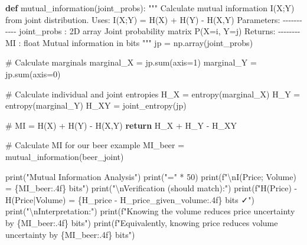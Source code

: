 \documentclass[
  11pt,
  letterpaper,
  oneside,
  openany]{book}
\newenvironment{Shaded}{\begin{snugshade}}{\end{snugshade}}
\newcommand{\BuiltInTok}[1]{\textcolor[rgb]{0.00,0.23,0.31}{#1}}
\newcommand{\CharTok}[1]{\textcolor[rgb]{0.13,0.47,0.30}{#1}}
\newcommand{\CommentTok}[1]{\textcolor[rgb]{0.37,0.37,0.37}{#1}}
\newcommand{\ControlFlowTok}[1]{\textcolor[rgb]{0.00,0.23,0.31}{\textbf{#1}}}
\newcommand{\DecValTok}[1]{\textcolor[rgb]{0.68,0.00,0.00}{#1}}
\newcommand{\KeywordTok}[1]{\textcolor[rgb]{0.00,0.23,0.31}{\textbf{#1}}}
\newcommand{\NormalTok}[1]{\textcolor[rgb]{0.00,0.23,0.31}{#1}}
\newcommand{\OperatorTok}[1]{\textcolor[rgb]{0.37,0.37,0.37}{#1}}
\newcommand{\SpecialCharTok}[1]{\textcolor[rgb]{0.37,0.37,0.37}{#1}}
\newcommand{\SpecialStringTok}[1]{\textcolor[rgb]{0.13,0.47,0.30}{#1}}
\newcommand{\StringTok}[1]{\textcolor[rgb]{0.13,0.47,0.30}{#1}}
\begin{document}
\begin{Shaded}
\begin{Highlighting}[]
\KeywordTok{def}\NormalTok{ mutual\_information(joint\_probs):}
    \CommentTok{"""}
\CommentTok{    Calculate mutual information I(X;Y) from joint distribution.}
\CommentTok{    }
\CommentTok{    Uses: I(X;Y) = H(X) + H(Y) {-} H(X,Y)}
\CommentTok{    }
\CommentTok{    Parameters:}
\CommentTok{    {-}{-}{-}{-}{-}{-}{-}{-}{-}{-}{-}}
\CommentTok{    joint\_probs : 2D array}
\CommentTok{        Joint probability matrix P(X=i, Y=j)}
\CommentTok{        }
\CommentTok{    Returns:}
\CommentTok{    {-}{-}{-}{-}{-}{-}{-}{-}}
\CommentTok{    MI : float}
\CommentTok{        Mutual information in bits}
\CommentTok{    """}
\NormalTok{    jp }\OperatorTok{=}\NormalTok{ np.array(joint\_probs)}
    
    \CommentTok{\# Calculate marginals}
\NormalTok{    marginal\_X }\OperatorTok{=}\NormalTok{ jp.}\BuiltInTok{sum}\NormalTok{(axis}\OperatorTok{=}\DecValTok{1}\NormalTok{)}
\NormalTok{    marginal\_Y }\OperatorTok{=}\NormalTok{ jp.}\BuiltInTok{sum}\NormalTok{(axis}\OperatorTok{=}\DecValTok{0}\NormalTok{)}
    
    \CommentTok{\# Calculate individual and joint entropies}
\NormalTok{    H\_X }\OperatorTok{=}\NormalTok{ entropy(marginal\_X)}
\NormalTok{    H\_Y }\OperatorTok{=}\NormalTok{ entropy(marginal\_Y)}
\NormalTok{    H\_XY }\OperatorTok{=}\NormalTok{ joint\_entropy(jp)}
    
    \CommentTok{\# MI = H(X) + H(Y) {-} H(X,Y)}
    \ControlFlowTok{return}\NormalTok{ H\_X }\OperatorTok{+}\NormalTok{ H\_Y }\OperatorTok{{-}}\NormalTok{ H\_XY}


\CommentTok{\# Calculate MI for our beer example}
\NormalTok{MI\_beer }\OperatorTok{=}\NormalTok{ mutual\_information(beer\_joint)}

\BuiltInTok{print}\NormalTok{(}\StringTok{"Mutual Information Analysis"}\NormalTok{)}
\BuiltInTok{print}\NormalTok{(}\StringTok{"="} \OperatorTok{*} \DecValTok{50}\NormalTok{)}
\BuiltInTok{print}\NormalTok{(}\SpecialStringTok{f"}\CharTok{\textbackslash{}n}\SpecialStringTok{I(Price; Volume) = }\SpecialCharTok{\{}\NormalTok{MI\_beer}\SpecialCharTok{:.4f\}}\SpecialStringTok{ bits"}\NormalTok{)}
\BuiltInTok{print}\NormalTok{(}\StringTok{"}\CharTok{\textbackslash{}n}\StringTok{Verification (should match):"}\NormalTok{)}
\BuiltInTok{print}\NormalTok{(}\SpecialStringTok{f"H(Price) {-} H(Price|Volume) = }\SpecialCharTok{\{}\NormalTok{H\_price }\OperatorTok{{-}}\NormalTok{ H\_price\_given\_volume}\SpecialCharTok{:.4f\}}\SpecialStringTok{ bits ✓"}\NormalTok{)}
\BuiltInTok{print}\NormalTok{(}\StringTok{"}\CharTok{\textbackslash{}n}\StringTok{Interpretation:"}\NormalTok{)}
\BuiltInTok{print}\NormalTok{(}\SpecialStringTok{f"Knowing the volume reduces price uncertainty by }\SpecialCharTok{\{}\NormalTok{MI\_beer}\SpecialCharTok{:.4f\}}\SpecialStringTok{ bits"}\NormalTok{)}
\BuiltInTok{print}\NormalTok{(}\SpecialStringTok{f"Equivalently, knowing price reduces volume uncertainty by }\SpecialCharTok{\{}\NormalTok{MI\_beer}\SpecialCharTok{:.4f\}}\SpecialStringTok{ bits"}\NormalTok{)}


\end{Highlighting}
\end{Shaded}
\end{document}
